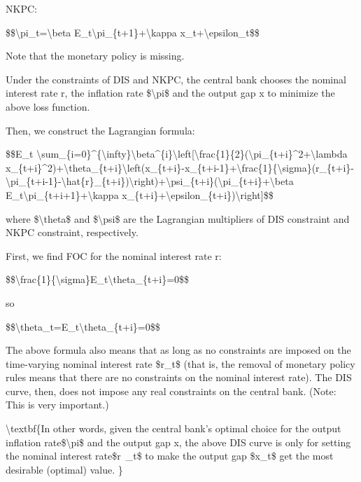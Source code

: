 \documentclass[10pt,math=newtx,citestyle=gb7714-2015,bibstyle=gb7714-2015]{elegantbook}
\begin{document}
	NKPC:
	
	\$\$\textbackslash{}pi\_t=\textbackslash{}beta E\_t\textbackslash{}pi\_\{t+1\}+\textbackslash{}kappa x\_t+\textbackslash{}epsilon\_t\$\$
	
	Note that the monetary policy is missing.
	
	Under the constraints of DIS and NKPC, the central bank chooses the nominal interest rate r, the inflation rate \$\textbackslash{}pi\$ and the output gap x to minimize the above loss function.
	
	Then, we construct the Lagrangian formula:
	
	\$\$E\_t \textbackslash{}sum\_\{i=0\}\^{}\{\textbackslash{}infty\}\textbackslash{}beta\^{}\{i\}\textbackslash{}left[\textbackslash{}frac\{1\}\{2\}(\textbackslash{}pi\_\{t+i\}\^{}2+\textbackslash{}lambda x\_\{t+i\}\^{}2)+\textbackslash{}theta\_\{t+i\}\textbackslash{}left(x\_\{t+i\}-x\_\{t+i-1\}+\textbackslash{}frac\{1\}\{\textbackslash{}sigma\}(r\_\{t+i\}-\textbackslash{}pi\_\{t+i-1\}-\textbackslash{}hat\{r\}\_\{t+i\})\textbackslash{}right)+\textbackslash{}psi\_\{t+i\}(\textbackslash{}pi\_\{t+i\}+\textbackslash{}beta E\_t\textbackslash{}pi\_\{t+i+1\}+\textbackslash{}kappa x\_\{t+i\}+\textbackslash{}epsilon\_\{t+i\})\textbackslash{}right]\$\$
	
	where \$\textbackslash{}theta\$ and \$\textbackslash{}psi\$ are the Lagrangian multipliers of DIS constraint and NKPC constraint, respectively.
	
	First, we find FOC for the nominal interest rate r:
	
	\$\$\textbackslash{}frac\{1\}\{\textbackslash{}sigma\}E\_t\textbackslash{}theta\_\{t+i\}=0\$\$
	
	so
	
	\$\$\textbackslash{}theta\_t=E\_t\textbackslash{}theta\_\{t+i\}=0\$\$
	
	The above formula also means that as long as no constraints are imposed on the time-varying nominal interest rate \$r\_t\$ (that is, the removal of monetary policy rules means that there are no constraints on the nominal interest rate). The DIS curve, then, does not impose any real constraints on the central bank. (Note: This is very important.)
	
	\textbackslash{}textbf\{In other words, given the central bank's optimal choice for the output inflation rate\$\textbackslash{}pi\$ and the output gap x, the above DIS curve is only for setting the nominal interest rate\$r\ _t\$ to make the output gap \$x\_t\$ get the most desirable (optimal) value. \}
	
\end{document}
